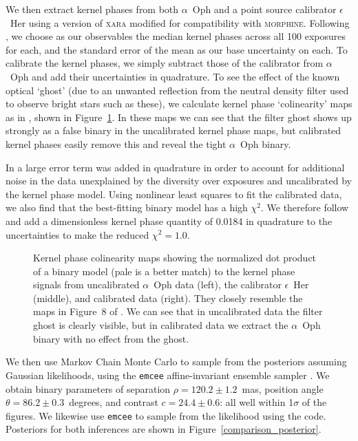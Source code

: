 \documentclass[modern]{aastex63}
\begin{document}
We then extract kernel phases from both $\alpha$~Oph and a point source calibrator $\epsilon$~Her using a version of \textsc{xara} modified for compatibility with \textsc{morphine}. Following \citet{martinache20}, we choose as our observables the median kernel phases across all 100 exposures for each, and the standard error of the mean as our base uncertainty on each. To calibrate the kernel phases, we simply subtract those of the calibrator from $\alpha$~Oph and add their uncertainties in quadrature. To see the effect of the known optical `ghost' (due to an unwanted reflection from the neutral density filter used to observe bright stars such as these), we calculate kernel phase `colinearity' maps as in \citet{martinache20}, shown in Figure~\ref{colinearity}. In these maps we can see that the filter ghost shows up strongly as a false binary in the uncalibrated kernel phase maps, but calibrated kernel phases easily remove this and reveal the tight $\alpha$~Oph binary. 

In \citet{martinache20} a large error term was added in quadrature in order to account for additional noise in the data unexplained by the diversity over exposures and uncalibrated by the kernel phase model. Using nonlinear least squares to fit the calibrated data, we also find that the best-fitting binary model has a high $\chi^2$. We therefore follow \citet{martinache20} and add a dimensionless kernel phase quantity of 0.0184 in quadrature to the uncertainties to make the reduced $\chi^2 = 1.0$.

\begin{figure}
\caption{Kernel phase colinearity maps showing the normalized dot product of a binary model (pale is a better match) to the kernel phase signals from uncalibrated $\alpha$~Oph data (left), the calibrator $\epsilon$~Her (middle), and calibrated data (right). They closely resemble the maps in Figure~8 of \citet{martinache20}. We can see that in uncalibrated data the filter ghost is clearly visible, but in calibrated data we extract the $\alpha$~Oph binary with no effect from the ghost. \href{https://github.com/benjaminpope/morphine/blob/stable/notebooks/pharo_test.ipynb}{\color{linkcolor}\faGithub} \label{colinearity}}
\end{figure}

We then use Markov Chain Monte Carlo \citep{metropolis53} to sample from the posteriors assuming Gaussian likelihoods, using the \texttt{emcee} affine-invariant ensemble sampler \citep{emcee}. We obtain binary parameters of separation $\rho = 120.2 \pm 1.2$~mas, position angle $\theta = 86.2 \pm 0.3$~degrees, and contrast $c = 24.4 \pm 0.6$: all well within 1$\sigma$ of the \citet{martinache20} figures. We likewise use \texttt{emcee} to sample from the likelihood using the \citet{martinache20} code. Posteriors for both inferences are shown in Figure~\ref{comparison_posterior}.
\end{document}
